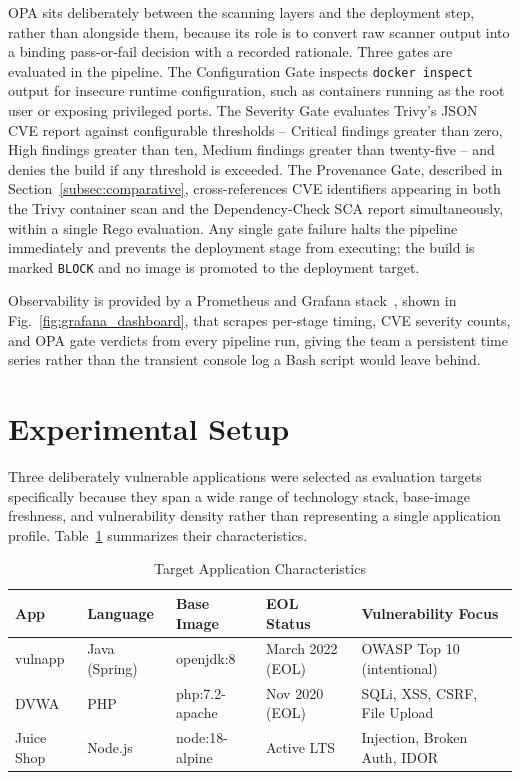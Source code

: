 \documentclass[conference]{IEEEtran}
\begin{document}
OPA sits deliberately between the scanning layers and the deployment step, rather than alongside them, because its role is to convert raw scanner output into a binding pass-or-fail decision with a recorded rationale. Three gates are evaluated in the pipeline. The Configuration Gate inspects \texttt{docker inspect} output for insecure runtime configuration, such as containers running as the root user or exposing privileged ports. The Severity Gate evaluates Trivy's JSON CVE report against configurable thresholds -- Critical findings greater than zero, High findings greater than ten, Medium findings greater than twenty-five -- and denies the build if any threshold is exceeded. The Provenance Gate, described in Section~\ref{subsec:comparative}, cross-references CVE identifiers appearing in both the Trivy container scan and the Dependency-Check SCA report simultaneously, within a single Rego evaluation. Any single gate failure halts the pipeline immediately and prevents the deployment stage from executing; the build is marked \texttt{BLOCK} and no image is promoted to the deployment target.

Observability is provided by a Prometheus and Grafana stack~\cite{ref7}, shown in Fig.~\ref{fig:grafana_dashboard}, that scrapes per-stage timing, CVE severity counts, and OPA gate verdicts from every pipeline run, giving the team a persistent time series rather than the transient console log a Bash script would leave behind.

\section{Experimental Setup}
\label{sec:setup}

Three deliberately vulnerable applications were selected as evaluation targets specifically because they span a wide range of technology stack, base-image freshness, and vulnerability density rather than representing a single application profile. Table~\ref{tab:targets} summarizes their characteristics.

\begin{table}[t]
\centering
\caption{Target Application Characteristics}
\label{tab:targets}
\footnotesize
\begin{tabular}{|l|l|l|l|l|}
\hline
\textbf{App} & \textbf{Language} & \textbf{Base Image} & \textbf{EOL Status} & \textbf{Vulnerability Focus} \\
\hline
vulnapp    & Java (Spring) & openjdk:8       & March 2022 (EOL) & OWASP Top 10 (intentional) \\
DVWA       & PHP           & php:7.2-apache  & Nov 2020 (EOL)   & SQLi, XSS, CSRF, File Upload \\
Juice Shop & Node.js       & node:18-alpine  & Active LTS       & Injection, Broken Auth, IDOR \\
\hline
\end{tabular}
\end{table}
\end{document}
